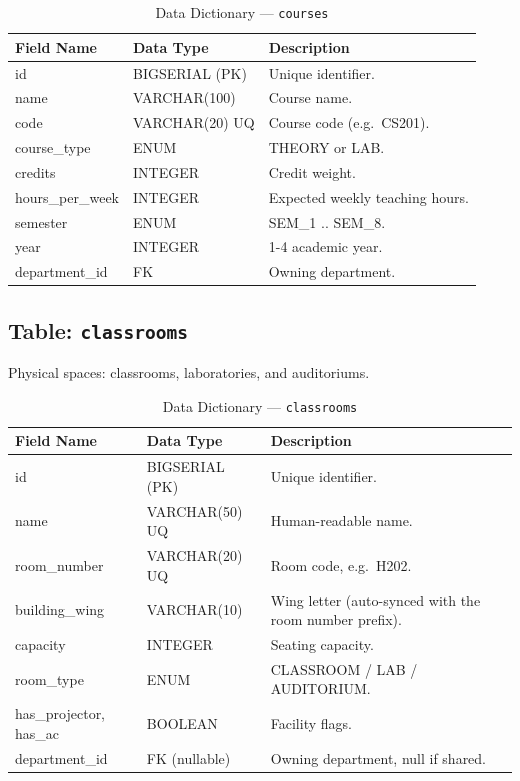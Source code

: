 \begin{table}[H]
    \centering
    \renewcommand{\arraystretch}{1.5}
    \begin{tabular}{|p{3cm}|p{3cm}|p{7.5cm}|}
        \hline
        \textbf{Field Name} & \textbf{Data Type} & \textbf{Description} \\
        \hline
        id & BIGSERIAL (PK) & Unique identifier. \\
        \hline
        name & VARCHAR(100) & Course name. \\
        \hline
        code & VARCHAR(20) UQ & Course code (e.g.\ CS201). \\
        \hline
        course\_type & ENUM & THEORY or LAB. \\
        \hline
        credits & INTEGER & Credit weight. \\
        \hline
        hours\_per\_week & INTEGER & Expected weekly teaching hours. \\
        \hline
        semester & ENUM & SEM\_1 .. SEM\_8. \\
        \hline
        year & INTEGER & 1-4 academic year. \\
        \hline
        department\_id & FK & Owning department. \\
        \hline
    \end{tabular}
    \caption{Data Dictionary --- \texttt{courses}}
    \label{tab:dd_courses}
\end{table}

\subsection{Table: \texttt{classrooms}}
Physical spaces: classrooms, laboratories, and auditoriums.

\begin{table}[H]
    \centering
    \renewcommand{\arraystretch}{1.5}
    \begin{tabular}{|p{3cm}|p{3cm}|p{7.5cm}|}
        \hline
        \textbf{Field Name} & \textbf{Data Type} & \textbf{Description} \\
        \hline
        id & BIGSERIAL (PK) & Unique identifier. \\
        \hline
        name & VARCHAR(50) UQ & Human-readable name. \\
        \hline
        room\_number & VARCHAR(20) UQ & Room code, e.g.\ H202. \\
        \hline
        building\_wing & VARCHAR(10) & Wing letter (auto-synced with the room number prefix). \\
        \hline
        capacity & INTEGER & Seating capacity. \\
        \hline
        room\_type & ENUM & CLASSROOM / LAB / AUDITORIUM. \\
        \hline
        has\_projector, has\_ac & BOOLEAN & Facility flags. \\
        \hline
        department\_id & FK (nullable) & Owning department, null if shared. \\
        \hline
    \end{tabular}
    \caption{Data Dictionary --- \texttt{classrooms}}
    \label{tab:dd_classrooms}
\end{table}

